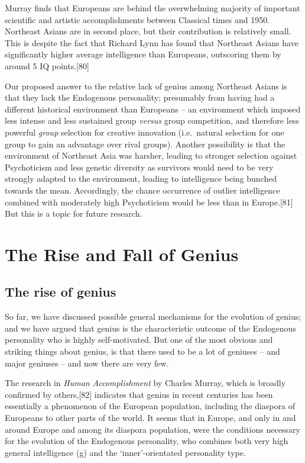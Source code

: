 \documentclass[
]{book}
\begin{document}
Murray finds that Europeans are behind the overwhelming majority of important scientific and artistic accomplishments between Classical times and 1950. Northeast Asians are in second place, but their contribution is relatively small. This is despite the fact that Richard Lynn has found that Northeast Asians have significantly higher average intelligence than Europeans, outscoring them by around 5 IQ points.{[}80{]}

Our proposed answer to the relative lack of genius among Northeast Asians is that they lack the Endogenous personality; presumably from having had a different historical environment than Europeans -- an environment which imposed less intense and less sustained group \emph{versus} group competition, and therefore less powerful \emph{group} selection for creative innovation (i.e.~natural selection for one group to gain an advantage over rival groups). Another possibility is that the environment of Northeast Asia was harsher, leading to stronger selection against Psychoticism and less genetic diversity as survivors would need to be very strongly adapted to the environment, leading to intelligence being bunched towards the mean. Accordingly, the chance occurrence of outlier intelligence combined with moderately high Psychoticism would be less than in Europe.{[}81{]} But this is a topic for future research.

\hypertarget{the-rise-and-fall-of-genius}{%
\chapter{The Rise and Fall of Genius}\label{the-rise-and-fall-of-genius}}

\hypertarget{the-rise-of-genius}{%
\section{The rise of genius}\label{the-rise-of-genius}}

So far, we have discussed possible general mechanisms for the evolution of genius; and we have argued that genius is the characteristic outcome of the Endogenous personality who is highly self-motivated. But one of the most obvious and striking things about genius, is that there used to be a lot of geniuses -- and major geniuses -- and now there are very few.

The research in \emph{Human Accomplishment} by Charles Murray, which is broadly confirmed by others,{[}82{]} indicates that genius in recent centuries has been essentially a phenomenon of the European population, including the diaspora of Europeans to other parts of the world. It seems that in Europe, and only in and around Europe and among its diaspora population, were the conditions necessary for the evolution of the Endogenous personality, who combines both very high general intelligence (g) and the `inner'-orientated personality type.
\end{document}
